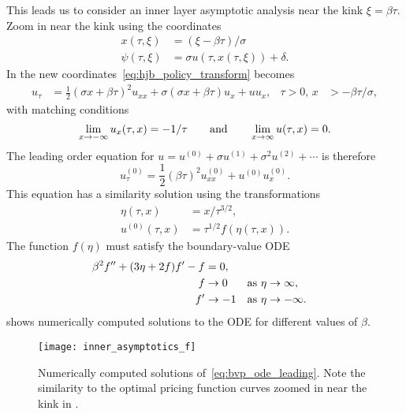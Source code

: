 \documentclass[main.tex]{subfiles}
\begin{document}
This leads us to consider an inner layer asymptotic analysis near
the kink $\xi = \beta \tau$. Zoom in near the kink using the
coordinates
\begin{align}
  x(\tau,\xi) &= (\xi-\beta \tau)/\sigma\\
  \psi(\tau,\xi) &= \sigma
                   u(\tau,x(\tau,\xi)) + \delta.
\end{align}
In the new coordinates~\eqref{eq:hjb_policy_transform} becomes
\begin{align}
  u_\tau %
  &=\frac{1}{2}{(\sigma x + \beta \tau)}^2u_{xx}
    +\sigma (\sigma x+\beta \tau)u_x  %
    + uu_x,&\tau>0,\,x&> -\beta \tau/\sigma,
\end{align}
with matching conditions
\begin{equation}
  \lim_{x \to -\infty} u_x(\tau,x) = -1/\tau \qquad \textnormal{and}
  \qquad \lim_{x\to \infty}u(\tau,x) = 0.
\end{equation}
The leading order equation for $u = u^{(0)}+\sigma u^{(1)}+\sigma^2 u^{(2)}+\cdots$ is therefore
\begin{equation}
  u^{(0)}_\tau = \frac{1}{2}{(\beta \tau)}^2u^{(0)}_{xx} + u^{(0)}u^{(0)}_x.
\end{equation}
This equation has a similarity solution using the transformations
\begin{align}
  \eta(\tau,x)&= x/\tau^{3/2},\\
  u^{(0)}(\tau,x) &= \tau^{1/2}f(\eta(\tau,x)).
\end{align}
The function $f(\eta)$ must satisfy the boundary-value ODE
\begin{align}\label{eq:bvp_ode_leading}
  \beta^2f^{\prime\prime} + (3\eta + 2f)f^\prime - f
  &= 0,\\
  f&\to 0 &\textnormal{as } \eta&\to \infty,\\
  f^\prime &\to -1&\textnormal{as } \eta&\to -\infty.
\end{align}
 shows numerically computed solutions to the
ODE for different values of $\beta$.
\begin{figure}[hbt]
  \centering
  \texttt{[image: inner\_asymptotics\_f]}
  \caption[Numerically computed solutions of asymptotics problem]{Numerically computed solutions of~\eqref{eq:bvp_ode_leading}.
    Note the similarity to the optimal pricing function curves zoomed
    in near the kink in .
  }\label{fig:inner_leading_f}
\end{figure}
\end{document}
